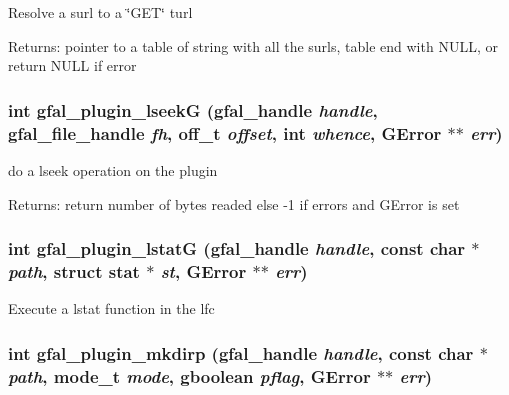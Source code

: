 Resolve a surl to a \char`\"{}GET\char`\"{} turl \begin{Desc}
\item[Returns:]pointer to a table of string with all the surls, table end with NULL, or return NULL if error \end{Desc}
\subsubsection{\setlength{\rightskip}{0pt plus 5cm}int gfal\_\-plugin\_\-lseek\-G (gfal\_\-handle {\em handle}, gfal\_\-file\_\-handle {\em fh}, off\_\-t {\em offset}, int {\em whence}, GError $\ast$$\ast$ {\em err})}\label{gfal__common__plugin_8h_c29b06ae43aa86049b513d1174393019}


do a lseek operation on the plugin \begin{Desc}
\item[Returns:]return number of bytes readed else -1 if errors and GError is set \end{Desc}
\subsubsection{\setlength{\rightskip}{0pt plus 5cm}int gfal\_\-plugin\_\-lstat\-G (gfal\_\-handle {\em handle}, const char $\ast$ {\em path}, struct stat $\ast$ {\em st}, GError $\ast$$\ast$ {\em err})}\label{gfal__common__plugin_8h_81a0d301234958fc59518fb6ce306425}


Execute a lstat function in the lfc 
\subsubsection{\setlength{\rightskip}{0pt plus 5cm}int gfal\_\-plugin\_\-mkdirp (gfal\_\-handle {\em handle}, const char $\ast$ {\em path}, mode\_\-t {\em mode}, gboolean {\em pflag}, GError $\ast$$\ast$ {\em err})}\label{gfal__common__plugin_8h_815a97902a1067b99f9bcc2f63b19e11}


